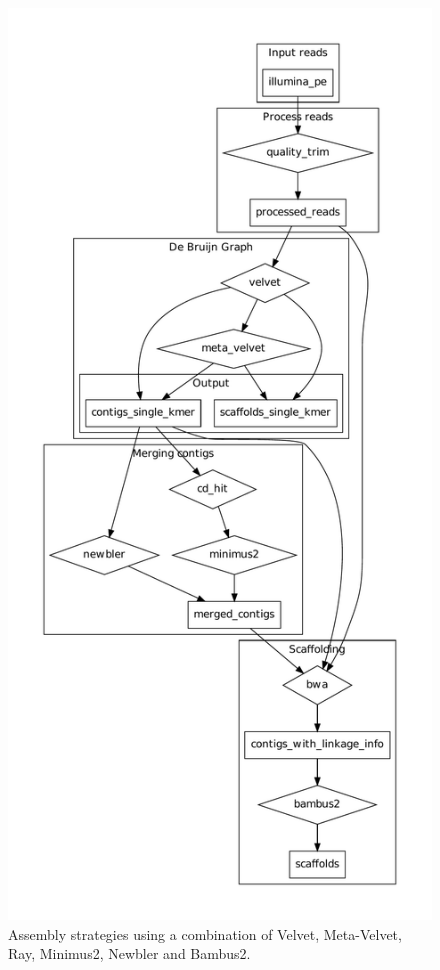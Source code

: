\documentclass[a4paper,12pt]{report}
\begin{document}
\clearpage
\thispagestyle{empty}
\begin{figure}[ht!]
  \centering
    \includegraphics[height=\textheight]{figures/metassemble-flowchart.pdf}
  \caption{Assembly strategies using a combination of Velvet, Meta-Velvet, Ray, Minimus2, Newbler and Bambus2.}
  \label{fig:asmstrat}
\end{figure}
\end{document}
